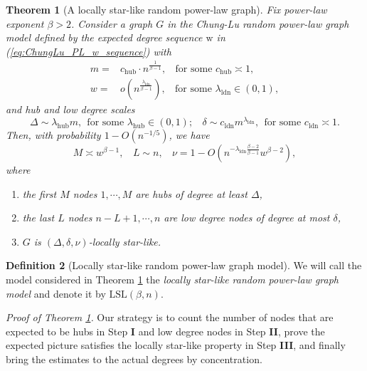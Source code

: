 \documentclass[a4paper]{article}
\theoremstyle{plain}
\newtheorem{theorem}{Theorem}[section] %
\theoremstyle{definition}
\newtheorem{defn}[theorem]{Definition}%
\newcommand{\brw}{\boldsymbol{\mathrm{w}}}
\begin{document}
\begin{theorem}[A locally star-like random power-law graph]\label{thm:loc_starlike_PL}
	Fix power-law exponent $\beta>2$. Consider a graph $G$ in the Chung-Lu random power-law graph model defined by the expected degree sequence $\brw$ in (\ref{eq:ChungLu_PL_w_sequence}) with 
	\begin{align*}
		m=& c_{\mathrm{hub}}\cdot n^{\frac{1}{\beta-1}},~~~~\text{for some }c_{\mathrm{hub}}\asymp 1,\\
		w=& o\left(n^{\frac{\lambda_{\mathrm{ldn}}}{\beta-1}}\right),~~~~\text{for some }\lambda_{\mathrm{ldn}}\in(0,1),
	\end{align*}
	and hub and low degree scales 
	$$\Delta\sim \lambda_{\mathrm{hub}} m, ~~\text{for some } \lambda_{\mathrm{hub}}\in(0,1);~~~~\delta\sim c_{\mathrm{ldn}} m^{\lambda_{\mathrm{ldn}}},~~\text{for some }c_{\mathrm{ldn}}\asymp1.$$ Then, with probability $1-O(n^{-1/5})$, we have
	$$M\asymp w^{\beta-1},~~~~L\sim n,~~~~\nu=1-O\left(n^{-\lambda_{\mathrm{ldn}}\frac{\beta-2}{\beta-1}} w^{\beta-2}\right),$$
	where
	\begin{enumerate}
		\item[(i)] the first $M$ nodes $1,\cdots,M$ are hubs of degree at least $\Delta$, 
		\item[(ii)] the last $L$ nodes $n-L+1,\cdots,n$ are low degree nodes of degree at most $\delta$,
		\item[(iii)] $G$ is $(\Delta,\delta,\nu)$-locally star-like. 
	\end{enumerate}
\end{theorem}


\begin{defn}[Locally star-like random power-law graph model]
	We will call the model considered in Theorem \ref{thm:loc_starlike_PL} the \textit{locally star-like random power-law graph model} and denote it by $\mathrm{LSL}(\beta,n)$.
\end{defn}


\textit{Proof of Theorem \ref{thm:loc_starlike_PL}.}
Our strategy is to count the number of nodes that are expected to be hubs in Step \textbf{I} and low degree nodes in Step \textbf{II}, prove the expected picture satisfies the locally star-like property in Step \textbf{III}, and finally bring the estimates to the actual degrees by concentration.
\end{document}
